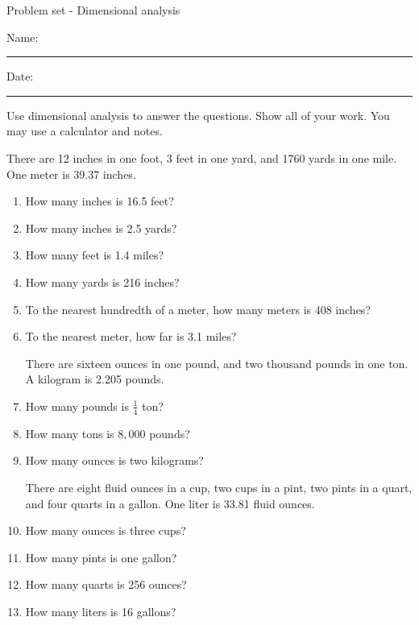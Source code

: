 \documentclass[12pt]{article}
\begin{document}
\pagestyle{empty} %
\begin{center}
          Problem set - Dimensional analysis \\[0.5in]
\end{center}
Name: \rule{4in}{0.005in} Date: \rule{1.5in}{0.005in} 
  \vspace{0.25in}

Use dimensional analysis to answer the questions. Show all of your work. You may use a calculator and notes. 

There are 12 inches in one foot, 3 feet in one yard, and 1760 yards in one mile. One meter is 39.37 inches. 

\newcommand{\spacing}{\vspace{0.80in}}
\begin{enumerate}
\item How many inches is 16.5 feet? 
\spacing

\item How many inches is 2.5 yards? 
\spacing

\item How many feet is 1.4 miles? 
\spacing

\item How many yards is 216 inches? 
\spacing

\item To the nearest hundredth of a meter, how many meters is 408 inches? 
\spacing

\item To the nearest meter, how far is 3.1 miles? 
\spacing

There are sixteen ounces in one pound, and two thousand pounds in one ton. A kilogram is 2.205 pounds. 

\item How many pounds is $\frac{1}{4}$ ton? 
\spacing

\item How many tons is $8,000$ pounds? 
\spacing

\item How many ounces is two kilograms?  
\spacing

There are eight fluid ounces in a cup, two cups in a pint, two pints in a quart, and four quarts in a gallon. One liter is 33.81 fluid ounces. 

\item How many ounces is three cups? 
\spacing

\item How many pints is one gallon?  
\spacing

\item How many quarts is 256 ounces? 
\spacing

\item How many liters is 16 gallons? 
\spacing

\end{enumerate}
\end{document}
